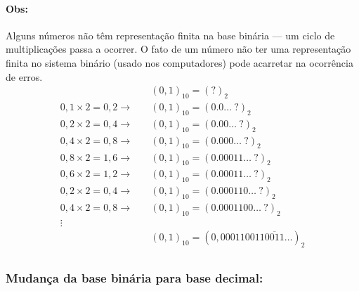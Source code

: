 \documentclass{article}
\begin{document}
\begin{enumerate}
                    \paragraph{Obs:} Alguns números não têm representação finita na base binária --- um ciclo de multiplicações passa a ocorrer. O fato de um número não ter uma representação finita no sistema binário (usado nos computadores) pode acarretar na ocorrência de erros.
                    \begin{align*}
                        &{(0,1)}_{10} = {(?)}_2\\
                        0,1 \times 2 = \boxed{0},2 \rightarrow \quad &{(0,1)}_{10} = {(0.\boxed{0}\ldots~?)}_2\\
                        0,2 \times 2 = \boxed{0},4 \rightarrow \quad &{(0,1)}_{10} = {(0.0\boxed{0}\ldots~?)}_2\\
                        0,4 \times 2 = \boxed{0},8 \rightarrow \quad &{(0,1)}_{10} = {(0.00\boxed{0}\ldots~?)}_2\\
                        0,8 \times 2 = \boxed{1},6 \rightarrow \quad &{(0,1)}_{10} = {(0.0001\boxed{1}\ldots~?)}_2\\
                        0,6 \times 2 = \boxed{1},2 \rightarrow \quad &{(0,1)}_{10} = {(0.0001\boxed{1}\ldots~?)}_2\\
                        0,2 \times 2 = \boxed{0},4 \rightarrow \quad &{(0,1)}_{10} = {(0.00011\boxed{0}\ldots~?)}_2\\
                        0,4 \times 2 = \boxed{0},8 \rightarrow \quad &{(0,1)}_{10} = {(0.000110\boxed{0}\ldots~?)}_2\\
                        \vdots\\
                        &{(0,1)}_{10} = {(0,000110011\overline{0011}\ldots)}_2\\
                    \end{align*}

            \end{enumerate}


        \subsubsection{Mudança da base binária para base decimal:}
\end{document}
